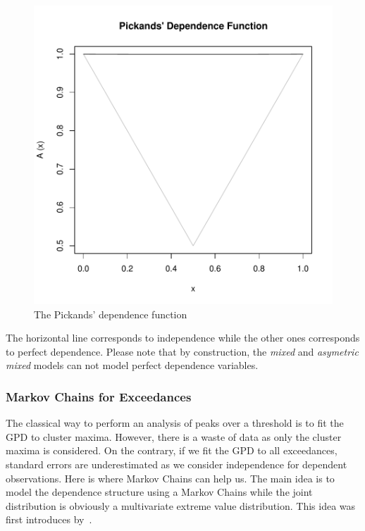 \documentclass[a4paper]{article}
\numberwithin{equation}{section}
\theoremstyle{definition}
\begin{document}
\begin{figure}
\centering
\includegraphics{guide-019}
\caption{The Pickands' dependence function}
\label{fig:pickdep}
\end{figure}

The horizontal line corresponds to independence while the
other ones corresponds to perfect dependence. Please note that by
construction, the \emph{mixed} and \emph{asymetric mixed} models can
not model perfect dependence variables.

\subsubsection{Markov Chains for Exceedances}

The classical way to perform an analysis of peaks over a threshold is
to fit the GPD to cluster maxima. However, there is a waste of data as
only the cluster maxima is considered. On the contrary, if we fit the
GPD to all exceedances, standard errors are underestimated as we
consider independence for dependent observations. Here is where Markov
Chains can help us. The main idea is to model the dependence structure
using a Markov Chains while the joint distribution is obviously a
multivariate extreme value distribution. This idea was first
introduces by~\citet{Smith1997}.
\end{document}
